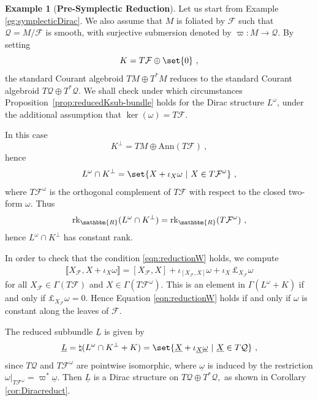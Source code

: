 \documentclass[a4paper, reqno, 11pt]{amsart}
\numberwithin{equation}{section}
\theoremstyle{definition}
\newtheorem{example}[equation]{Example}
\newcommand{\red}[1]{\underline{#1}}
\newcommand{\IR}{\mathbbm{R}}
\newcommand{\cQ}{{\mathcal Q}}
\newcommand{\cF}{{\mathcal F}}
\newcommand{\sfGamma}{{\mathsf{\Gamma}}}
\newcommand{\ann}{\mathrm{Ann}}
\newcommand{\rk}{\mathrm{rk}}
\theoremstyle{remark}
\begin{document}
\begin{example}[\textbf{Pre-Symplectic Reduction}] \label{eg:symplecticred}
Let us start from Example \ref{eg:symplecticDirac}. We also assume that $M$ is foliated by $\cF$ such that $\cQ = M / \cF$ is smooth, with surjective submersion denoted by $\varpi \colon M \to \cQ.$ By setting $$K = T\cF \oplus \set{0} \ , $$ the standard Courant algebroid $TM \oplus T^*M$ reduces to the standard Courant algebroid $T\cQ \oplus T^*\cQ.$ We shall check under which circumstances Proposition~\ref{prop:reducedKsub-bundle} holds for the Dirac structure $L^\omega$, under the additional assumption that $\ker(\omega)=T\cF$.

In this case $$K^\perp = TM \oplus \ann(T\cF) \ ,$$ hence
\begin{align}
    L^\omega\cap K^\perp =\set{X + \iota_X \omega \ \vert \ X \in T\cF^\omega} \ ,
\end{align}
where $T\cF^\omega$ is the orthogonal complement of $T\cF$ with respect to the closed two-form $\omega.$ Thus
\begin{align}
    \rk_\IR(L^\omega\cap K^\perp) = \rk_\IR(T\cF^\omega) \ ,
\end{align}
hence $L^\omega\cap K^\perp$ has constant rank. 

In order to check that the condition \eqref{eqn:reductionW} holds, we compute
\begin{align}
 \llbracket X_\cF , X + \iota_X \omega \rrbracket = [X_\cF, X] + \iota_{[X_\cF, X]}\omega + \iota_X\, \pounds_{X_\cF}\omega   
\end{align}
for all $X_\cF\in\sfGamma(T\cF)$ and $X \in \sfGamma(T\cF^\omega).$ This is an element in $\sfGamma(L^\omega+K)$ if and only if $\pounds_{X_\cF}\omega =0.$ Hence Equation \eqref{eqn:reductionW} holds if and only if $\omega$ is constant along the leaves of $\cF.$ 

The reduced subbundle $\red L$ is given by
\begin{align}
  {\red L} = \natural(L^\omega \cap K^\perp + K) =\set{ {\red X} + \iota_{\red X} {\red \omega} \ \vert \ {\red X} \in T\cQ} \ ,  
\end{align}
since $T\cQ$ and $T\cF^\omega$ are pointwise isomorphic, where $\red \omega$ is induced by the restriction $\omega \rvert_{T\cF^\omega} = \varpi^* {\red \omega}.$ Then $\red L$ is a Dirac structure on $T\cQ \oplus T^*\cQ,$ as shown in Corollary \ref{cor:Diracreduct}.
\end{example}

\medskip
\end{document}
